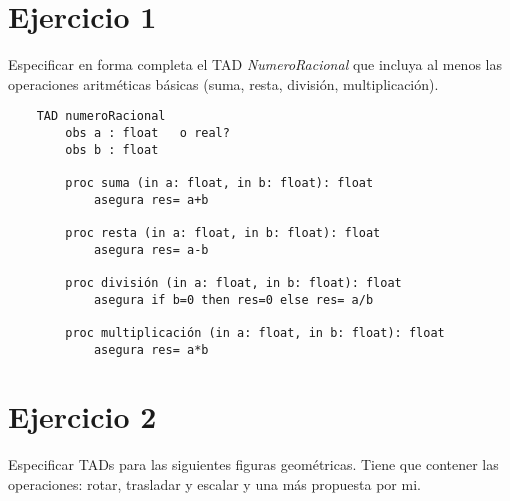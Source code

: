 \documentclass[10pt,a4paper]{article}
\begin{document}

\section{Ejercicio 1}
Especificar en forma completa el TAD \textit{NumeroRacional} que incluya al menos las operaciones aritméticas básicas (suma, resta, división, multiplicación).
\begin{lstlisting}
    TAD numeroRacional 
        obs a : float   o real?
        obs b : float
    
        proc suma (in a: float, in b: float): float
            asegura res= a+b

        proc resta (in a: float, in b: float): float
            asegura res= a-b
         
        proc división (in a: float, in b: float): float
            asegura if b=0 then res=0 else res= a/b

        proc multiplicación (in a: float, in b: float): float
            asegura res= a*b

\end{lstlisting}

\section{Ejercicio 2}
Especificar TADs para las siguientes figuras geométricas. Tiene que contener las operaciones: rotar, trasladar y escalar y una más propuesta por mi. 
\end{document}
